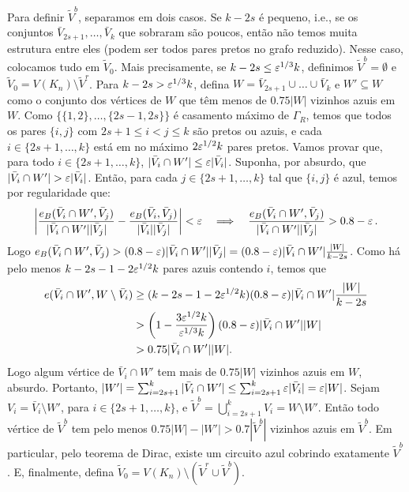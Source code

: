 Para definir $\tilde{V}^b$, separamos em dois casos. Se $k-2s$ é pequeno, i.e., se os conjuntos $\bar{V}_{2s+1},\dots, \bar{V}_k$ que sobraram são poucos, então não temos muita estrutura entre eles (podem ser todos pares pretos no grafo reduzido). Nesse caso, colocamos tudo em $\tilde{V}_0$. Mais precisamente, se $k-2s\leq\varepsilon^{1/3}k$, definimos $\tilde{V}^b = \emptyset$ e $\tilde{V}_0 = V(K_n)\setminus \tilde{V}^r$. Para $k-2s>\varepsilon^{1/3}k$, defina $W = \bar{V}_{2s+1}\cup\dots\cup \bar{V}_{k}$ e $W'\subseteq W$ como o conjunto dos vértices de $W$ que têm menos de $0.75|W|$ vizinhos azuis em $W$. Como $\{\{1,2\}, \dots, \{2s-1, 2s\}\}$ é casamento máximo de $\Gamma_R$, temos que todos os pares $\{i,j\}$ com $2s+1\leq i < j \leq k$ são pretos ou azuis, e cada $i\in\{2s+1,\dots,k\}$ está em no máximo $2\varepsilon^{1/2}k$ pares pretos. Vamos provar que, para todo $i\in\{2s+1,\dots,k\}$, $|\bar{V}_i\cap W'|\leq\varepsilon|\bar{V}_i|$. Suponha, por absurdo, que $|\bar{V}_i\cap W'| > \varepsilon|\bar{V}_i|$. Então, para cada $j\in\{2s+1,\dots,k\}$ tal que $\{i,j\}$ é azul, temos por regularidade que:
\begin{align*}
	\left|\frac{e_B(\bar{V}_i\cap W', \bar{V}_j)}{|\bar{V}_i\cap W'||\bar{V}_j|} - \frac{e_B(\bar{V}_i,\bar{V}_j)}{|\bar{V}_i||\bar{V}_j|}\right| < \varepsilon \quad
	\Longrightarrow \quad \frac{e_B(\bar{V}_i\cap W', \bar{V}_j)}{|\bar{V}_i\cap W'||\bar{V}_j|} > 0.8 - \varepsilon\,.
\end{align*}
Logo $e_B(\bar{V}_i\cap W', \bar{V}_j) > (0.8-\varepsilon)|\bar{V}_i\cap W'||\bar{V}_j| = (0.8-\varepsilon)|\bar{V}_i\cap W'|\frac{|W|}{k-2s}$. Como há pelo menos $k - 2s - 1 - 2\varepsilon^{1/2}k$ pares azuis contendo $i$, temos que 
\begin{align*}
	e(\bar{V}_i\cap W', W\setminus\bar{V}_i) &\geq (k-2s-1-2\varepsilon^{1/2}k)(0.8 - \varepsilon)|\bar{V}_i\cap W'|\frac{|W|}{k-2s} \\
	&> \left(1 - \frac{3\varepsilon^{1/2}k}{\varepsilon^{1/3}k}\right)(0.8 - \varepsilon)|\bar{V}_i\cap W'||W| \\
	&> 0.75|\bar{V}_i\cap W'||W|.
\end{align*}
Logo algum vértice de $\bar{V}_i\cap W'$ tem mais de $0.75|W|$ vizinhos azuis em $W$, absurdo. Portanto, $|W'| = \sum_{i=2s+1}^{k}|\bar{V}_i\cap W'|\leq\sum_{i=2s+1}^k\varepsilon|\bar{V}_i| = \varepsilon |W|$. Sejam $V_i = \bar{V}_i\setminus W'$, para $i\in \{2s+1,\dots,k\}$, e $\tilde{V}^b = \bigcup_{i=2s+1}^kV_i = W\setminus W'$. Então todo vértice de $\tilde{V}^b$ tem pelo menos $0.75|W| - |W'| > 0.7|\tilde{V}^b|$ vizinhos azuis em $\tilde{V}^b$. Em particular, pelo teorema de Dirac, existe um circuito azul cobrindo exatamente $\tilde{V}^b$. E, finalmente, defina $\tilde{V}_0 = V(K_n)\setminus(\tilde{V}^r\cup\tilde{V}^b)$.

